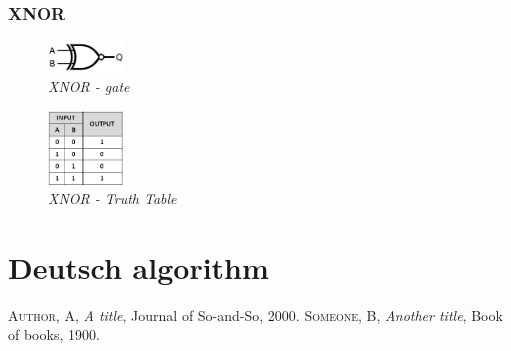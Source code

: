 \documentclass{article}
\begin{document}
\subsubsection{XNOR}
\begin{figure}[h]
\begin{center}
\begin{minipage}[b]{4cm}
\centering
\includegraphics[width=2cm]{xnor_gate.png}\\\textit{XNOR - gate}
\end{minipage}
\begin{minipage}[b]{2cm}
\centering
\includegraphics[width=2cm]{xnor_truthtable.png}\\\textit{XNOR - Truth Table}
\end{minipage}
\end{center}
\end{figure}
\newpage
\section{Deutsch algorithm}
\newpage
\begin{thebibliography}{x}
    {\scshape Author, A}, {\itshape A title}, Journal of So-and-So, 2000.
    {\scshape Someone, B}, {\itshape Another title}, Book of books, 1900.
\end{thebibliography}
\end{document}
